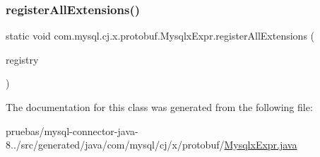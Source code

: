 \subsubsection{\texorpdfstring{register\+All\+Extensions()}{registerAllExtensions()}}
{\footnotesize\ttfamily static void com.\+mysql.\+cj.\+x.\+protobuf.\+Mysqlx\+Expr.\+register\+All\+Extensions (\begin{DoxyParamCaption}\item[{com.\+google.\+protobuf.\+Extension\+Registry}]{registry }\end{DoxyParamCaption})\hspace{0.3cm}{\ttfamily [static]}}



The documentation for this class was generated from the following file\+:\begin{DoxyCompactItemize}
\item 
pruebas/mysql-\/connector-\/java-\/8../src/generated/java/com/mysql/cj/x/protobuf/\mbox{\hyperlink{_mysqlx_expr_8java}{Mysqlx\+Expr.\+java}}\end{DoxyCompactItemize}
